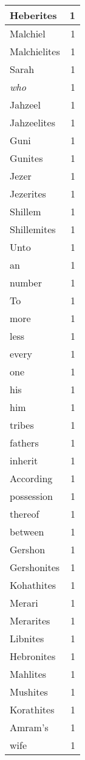 \begin{center}
\begin{longtable}{l|r}
Heberites & 1\\ \hline 
Malchiel & 1\\ \hline 
Malchielites & 1\\ \hline 
Sarah & 1\\ \hline 
\emph{who} & 1\\ \hline 
Jahzeel & 1\\ \hline 
Jahzeelites & 1\\ \hline 
Guni & 1\\ \hline 
Gunites & 1\\ \hline 
Jezer & 1\\ \hline 
Jezerites & 1\\ \hline 
Shillem & 1\\ \hline 
Shillemites & 1\\ \hline 
Unto & 1\\ \hline 
an & 1\\ \hline 
number & 1\\ \hline 
To & 1\\ \hline 
more & 1\\ \hline 
less & 1\\ \hline 
every & 1\\ \hline 
one & 1\\ \hline 
his & 1\\ \hline 
him & 1\\ \hline 
tribes & 1\\ \hline 
fathers & 1\\ \hline 
inherit & 1\\ \hline 
According & 1\\ \hline 
possession & 1\\ \hline 
thereof & 1\\ \hline 
between & 1\\ \hline 
Gershon & 1\\ \hline 
Gershonites & 1\\ \hline 
Kohathites & 1\\ \hline 
Merari & 1\\ \hline 
Merarites & 1\\ \hline 
Libnites & 1\\ \hline 
Hebronites & 1\\ \hline 
Mahlites & 1\\ \hline 
Mushites & 1\\ \hline 
Korathites & 1\\ \hline 
Amram's & 1\\ \hline 
wife & 1\\ \hline 

\end{longtable}
\end{center}
